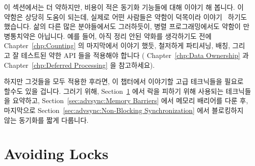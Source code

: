 
%

이 섹션에서는 더 약하지만, 비용이 적은 동기화 기능들에 대해 이야기 해 봅니다.
이 약함은 상당히 도움이 되는데, 실제로 어떤 사람들은 약함이 덕목이라
이야기~\cite{JadeAlglave2013-WeaknessIsVirtue} 하기도 했습니다.
삶의 다른 많은 분야들에서도 그러하듯이, 병렬 프로그래밍에서도 약함이
만병통치약은 아닙니다.
예를 들어, 아직 정리 안된 약화를 생각하기도 전에 Chapter~\ref{chp:Counting} 의
마지막에서 이야기 했듯, 철저하게 파티셔닝, 배칭, 그리고 잘 테스트된 약한 API
들을 적용해야 합니다 ( Chapter~\ref{chp:Data Ownership} 과
Chapter~\ref{chp:Deferred Processing} 을 참고하세요).

하지만 그것들을 모두 적용한 후라면, 이 챕터에서 이야기할 고급 테크닉들을 필요로
할수도 있을 겁니다.
그러기 위해, Section~\ref{sec:advsync:Avoiding Locks} 에서 락을 피하기 위해
사용되는 테크닉들을 요약하고, Section~\ref{sec:advsync:Memory Barriers} 에서
메모리 배리어를 다룬 후, 마지막으로 Section~\ref{sec:advsync:Non-Blocking
Synchronization} 에서 블로킹하지 않는 동기화를 짧게 다룹니다.
\iffalse

This section discusses a number of ways of using weaker, and hopefully
lower-cost, synchronization primitives.
This weakening can be quite helpful, in fact, some have argued
that weakness is a virtue~\cite{JadeAlglave2013-WeaknessIsVirtue}.
Nevertheless, in parallel programming, as in many other aspects
of life, weakness is not a panacea.
For example, as noted at the end of
Chapter~\ref{chp:Counting},
you should thoroughly apply partitioning, batching, and
well-tested packaged weak APIs (see Chapter~\ref{chp:Data Ownership}
and~\ref{chp:Deferred Processing})
before even thinking about unstructured weakening.

But after doing all that, you still might find yourself needing the
advanced techniques described in this chapter.
To that end,
Section~\ref{sec:advsync:Avoiding Locks}
summarizes techniques used thus far for avoiding locks,
Section~\ref{sec:advsync:Memory Barriers}
covers use of memory barriers, and finally
Section~\ref{sec:advsync:Non-Blocking Synchronization}
gives a brief overview of non-blocking synchronization.
\fi

\section{Avoiding Locks}
\label{sec:advsync:Avoiding Locks}

